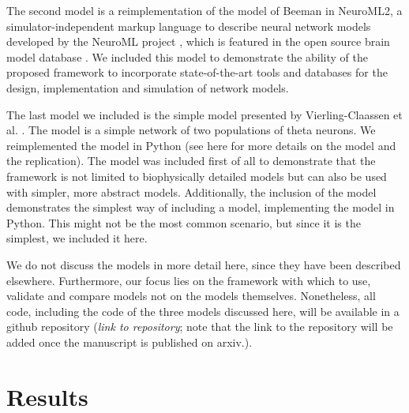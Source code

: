 \documentclass[a4paper,10pt]{article}
\begin{document}
The second model is a reimplementation of the model of Beeman in NeuroML2, a simulator-independent markup language to describe neural network models developed by the
NeuroML project \cite{}, which is featured in the open source brain model database \cite{}. We included this model to demonstrate the ability of the proposed framework
to incorporate state-of-the-art tools and databases for the design, implementation and simulation of network models.

The last model we included is the simple model presented by Vierling-Claassen et al. \cite{Vierling2008}. The model is a simple network of two populations of theta neurons. 
We reimplemented the model in Python (see here \cite{Metzner2017} for more details on the model and the replication).
The model
was included first of all to demonstrate that the framework is not limited to biophysically detailed models but can also be used with simpler, more abstract models.
Additionally, the inclusion of the model demonstrates the simplest way of including a model, implementing the model in Python. This might not be the most common scenario, but 
since it is the simplest, we included it here.

We do not discuss the models in more detail here, since they have been described elsewhere. Furthermore, our focus lies on the framework with which to use, validate and compare
models not on the models themselves. Nonetheless, all code, including the code of the three models discussed here, will be available in a github repository (\textit{link to repository}; note that the link to the repository 
will be added once the manuscript is published on arxiv.).


\section{Results}
\end{document}
